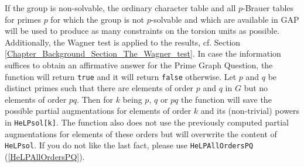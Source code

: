 \documentclass[a4paper,11pt]{report}
\begin{document}
{{{ If the group is non-solvable, the ordinary character table and all $p$-Brauer tables for primes $p$ for which the group is not $p$-solvable and which are available in GAP will be used to produce as many
constraints on the torsion units as possible. Additionally, the Wagner test is
applied to the results, cf. Section \ref{Chapter_Background_Section_The_Wagner_test}. In case the information suffices to obtain an affirmative answer for the
Prime Graph Question, the function will return \texttt{true} and it will return \texttt{false} otherwise. Let $p$ and $q$ be distinct primes such that there are elements of order $p$ and $q$ in $G$ but no elements of order $pq$. Then for $k$ being $p$, $q$ or $pq$ the function will save the possible partial augmentations for elements of
order $k$ and its (non-trivial) powers in \texttt{HeLP{\textunderscore}sol[k]}. The function also does not use the previously computed partial augmentations
for elements of these orders but will overwrite the content of \texttt{HeLP{\textunderscore}sol}. If you do not like the last fact, please use \texttt{HeLP{\textunderscore}AllOrdersPQ} (\ref{HeLPAllOrdersPQ}). }

}}
\end{document}
